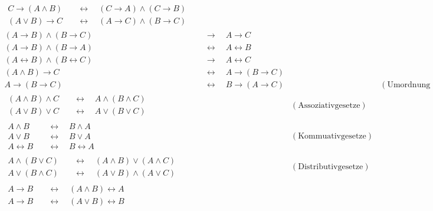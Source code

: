 \begin{align*}
    \begin{split}
        C\to (A\land B) & \quad\leftrightarrow\quad (C\to A) \land (C\to B) \\
        (A\lor B) \to C & \quad\leftrightarrow\quad (A\to C) \land (B\to C)
    \end{split} \\[1em]
    (A \to B) \land (B \to C) & \quad \to\quad A \to C \\ 
    (A \to B) \land (B \to A) & \quad\leftrightarrow\quad A \leftrightarrow B \\
    (A\leftrightarrow B)\land (B\leftrightarrow C) & \quad \to\quad A\leftrightarrow C \\[1em]
    (A \land B) \to C & \quad\leftrightarrow\quad A \to (B \to C) \\
    A \to (B \to C) & \quad\leftrightarrow\quad  B \to (A \to C) && ( \text{Umordnung der Prämissen}) \\[1em]
    \begin{split}
        (A \land B) \land C & \quad\leftrightarrow\quad A \land (B \land C) \\
        (A \lor B) \lor C & \quad\leftrightarrow\quad  A \lor (B \lor C)
    \end{split} && (\text{Assoziativgesetze}) \\[1em]
    \begin{split}
        A \land B & \quad\leftrightarrow\quad  B \land A \\
        A \lor B & \quad\leftrightarrow\quad  B \lor A \\
        A\leftrightarrow B &\quad\leftrightarrow\quad  B \leftrightarrow A
    \end{split} && ( \text{Kommuativgesetze}) \\[1em]
    \begin{split} A \land (B \lor C) & \quad\leftrightarrow\quad  (A \land B) \lor (A \land C) \\
        A \lor (B \land C) & \quad\leftrightarrow\quad  (A \lor B) \land (A \lor C)
    \end{split} && ( \text{Distributivgesetze}) \\[1em]
    \begin{split}
        A \to B & \quad\leftrightarrow\quad (A \land B) \leftrightarrow A \\
        A \to B & \quad\leftrightarrow\quad (A \lor B) \leftrightarrow B
    \end{split} \\[1em]

\end{align*}
